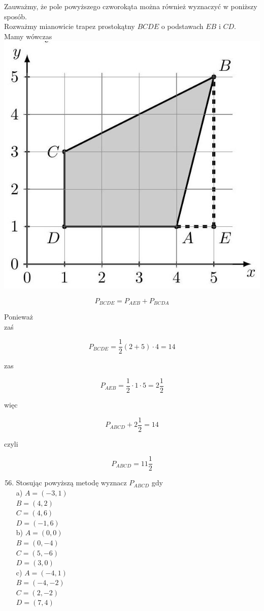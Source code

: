 \documentclass[10pt]{article}
\begin{document}
Zauważmy, że pole powyższego czworokąta można również wyznaczyć w poniższy sposób.\\
Rozważmy mianowicie trapez prostokątny \(B C D E\) o podstawach \(E B\) i \(C D\).\\
Mamy wówczas\\
\includegraphics[max width=\textwidth, center]{2024_11_21_8f01584889ff06348ae7g-203}

\[
P_{B C D E}=P_{A E B}+P_{B C D A}
\]

Ponieważ\\
zaś

\[
P_{B C D E}=\frac{1}{2}(2+5) \cdot 4=14
\]

zas

\[
P_{A E B}=\frac{1}{2} \cdot 1 \cdot 5=2 \frac{1}{2}
\]

więc

\[
P_{A B C D}+2 \frac{1}{2}=14
\]

czyli

\[
P_{A B C D}=11 \frac{1}{2}
\]

\begin{enumerate}
  \setcounter{enumi}{55}
  \item Stosując powyższą metodę wyznacz \(P_{A B C D}\) gdy\\
a) \(A=(-3,1)\)\\
\(B=(4,2)\)\\
\(C=(4,6)\)\\
\(D=(-1,6)\)\\
b) \(A=(0,0)\)\\
\(B=(0,-4)\)\\
\(C=(5,-6)\)\\
\(D=(3,0)\)\\
c) \(A=(-4,1)\)\\
\(B=(-4,-2)\)\\
\(C=(2,-2)\)\\
\(D=(7,4)\)
\end{enumerate}
\end{document}
